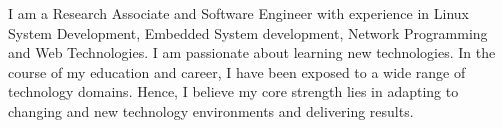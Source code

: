 

\begin{cvparagraph}

I am a Research Associate and Software Engineer with experience in Linux System Development, Embedded System development, Network Programming and Web Technologies. I am passionate about learning new technologies. In the course of my education and career, I have been exposed to a wide range of technology domains. Hence, I believe my core strength lies in adapting to changing and new technology environments and delivering results.
\end{cvparagraph}
